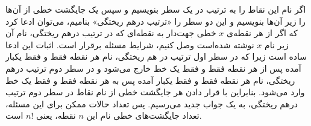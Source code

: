 \documentclass[12pt,onecolumn,a4paper]{article}
\begin{document}
	اگر نام این نقاط را به ترتیب در یک سطر بنویسیم و سپس
	یک جایگشت خطی از آن‌ها را زیر آن‌ها بنویسیم و این دو سطر را «ترتیب درهم ریختگی» بنامیم، می‌توان
	ادعا کرد که اگر از هر نقطه‌ی
	$x$
	خطی جهت‌دار به نقطه‌ای که در ترتیب درهم ریختگی، نام آن
	زیر نام
	$x$
	نوشته شده‌است وصل کنیم، شرایط مسئله برقرار است.
	اثبات این ادعا ساده است زیرا که در سطر اول ترتیب در هم ریختگی،
	نام هر نقطه فقط و فقط یکبار آمده پس از هر نقطه فقط و فقط یک خط خارج می‌شود
	و در سطر دوم ترتیب درهم ریختگی، نام هر نقطه فقط و فقط یکبار آمده پس
	به هر نقطه فقط و فقط یک خط وارد می‌شود. بنابراین با قرار دادن هر جایگشت خطی
	از نام نقاط در سطر دوم ترتیب درهم ریختگی، به یک جواب جدید می‌رسیم.
	پس تعداد حالات ممکن برای این مسئله، تعداد جایگشت‌های خطی نام این
	$n$
	نقطه، یعنی 
	$n!$
	است.	
\end{document}
